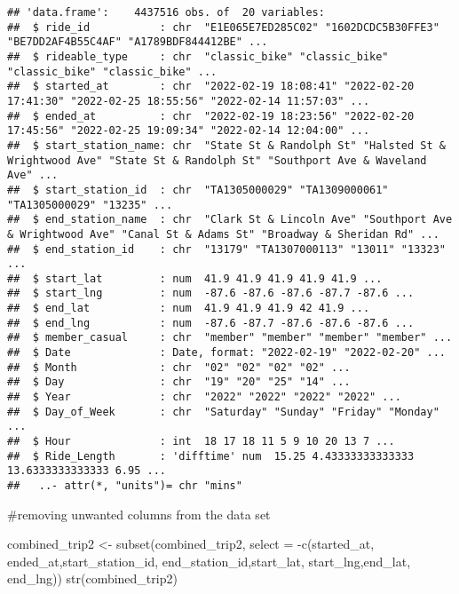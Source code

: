 \documentclass[
]{article}
\newenvironment{Shaded}{\begin{snugshade}}{\end{snugshade}}
\newcommand{\AttributeTok}[1]{\textcolor[rgb]{0.77,0.63,0.00}{#1}}
\newcommand{\FunctionTok}[1]{\textcolor[rgb]{0.00,0.00,0.00}{#1}}
\newcommand{\NormalTok}[1]{#1}
\newcommand{\OtherTok}[1]{\textcolor[rgb]{0.56,0.35,0.01}{#1}}
\newcommand{\SpecialCharTok}[1]{\textcolor[rgb]{0.00,0.00,0.00}{#1}}
\begin{document}
\begin{verbatim}
## 'data.frame':    4437516 obs. of  20 variables:
##  $ ride_id           : chr  "E1E065E7ED285C02" "1602DCDC5B30FFE3" "BE7DD2AF4B55C4AF" "A1789BDF844412BE" ...
##  $ rideable_type     : chr  "classic_bike" "classic_bike" "classic_bike" "classic_bike" ...
##  $ started_at        : chr  "2022-02-19 18:08:41" "2022-02-20 17:41:30" "2022-02-25 18:55:56" "2022-02-14 11:57:03" ...
##  $ ended_at          : chr  "2022-02-19 18:23:56" "2022-02-20 17:45:56" "2022-02-25 19:09:34" "2022-02-14 12:04:00" ...
##  $ start_station_name: chr  "State St & Randolph St" "Halsted St & Wrightwood Ave" "State St & Randolph St" "Southport Ave & Waveland Ave" ...
##  $ start_station_id  : chr  "TA1305000029" "TA1309000061" "TA1305000029" "13235" ...
##  $ end_station_name  : chr  "Clark St & Lincoln Ave" "Southport Ave & Wrightwood Ave" "Canal St & Adams St" "Broadway & Sheridan Rd" ...
##  $ end_station_id    : chr  "13179" "TA1307000113" "13011" "13323" ...
##  $ start_lat         : num  41.9 41.9 41.9 41.9 41.9 ...
##  $ start_lng         : num  -87.6 -87.6 -87.6 -87.7 -87.6 ...
##  $ end_lat           : num  41.9 41.9 41.9 42 41.9 ...
##  $ end_lng           : num  -87.6 -87.7 -87.6 -87.6 -87.6 ...
##  $ member_casual     : chr  "member" "member" "member" "member" ...
##  $ Date              : Date, format: "2022-02-19" "2022-02-20" ...
##  $ Month             : chr  "02" "02" "02" "02" ...
##  $ Day               : chr  "19" "20" "25" "14" ...
##  $ Year              : chr  "2022" "2022" "2022" "2022" ...
##  $ Day_of_Week       : chr  "Saturday" "Sunday" "Friday" "Monday" ...
##  $ Hour              : int  18 17 18 11 5 9 10 20 13 7 ...
##  $ Ride_Length       : 'difftime' num  15.25 4.43333333333333 13.6333333333333 6.95 ...
##   ..- attr(*, "units")= chr "mins"
\end{verbatim}

\#removing unwanted columns from the data set

\begin{Shaded}
\begin{Highlighting}[]
\NormalTok{combined\_trip2 }\OtherTok{\textless{}{-}} \FunctionTok{subset}\NormalTok{(combined\_trip2, }\AttributeTok{select =} \SpecialCharTok{{-}}\FunctionTok{c}\NormalTok{(started\_at, ended\_at,start\_station\_id, end\_station\_id,start\_lat, start\_lng,end\_lat, end\_lng))}
\FunctionTok{str}\NormalTok{(combined\_trip2)}
\end{Highlighting}
\end{Shaded}
\end{document}
